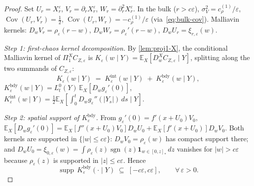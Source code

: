 \documentclass[EJP]{ejpecp}
\renewcommand{\E}{\mathbb{E}}
\newcommand{\IBM}{Z}
\newcommand{\Pir}{\Pi}
\DeclareMathOperator{\Cov}{Cov}
\DeclareMathOperator{\supp}{supp}
\DeclareMathOperator{\sgn}{sgn}
\begin{document}
\begin{proof}
Set $U_r=X^\varepsilon_r$, $V_r=\partial_rX^\varepsilon_r$,
$W_r=\partial_r^{2}X^\varepsilon_r$. In the bulk ($r>c\varepsilon$),
$\sigma_V^{2}=c_\rho^{(1)}/\varepsilon$, $\Cov(U_r,V_r)=\tfrac12$,
$\Cov(U_r,W_r)=-c_\rho^{(1)}/\varepsilon$
(via~\eqref{eq:bulk-cov}). Malliavin kernels:
$D_wV_r=\rho_\varepsilon(r-w)$, $D_wW_r=\rho_\varepsilon'(r-w)$,
$D_wU_r=\xi_{r,\varepsilon}(w)$.

\emph{Step 1: first-chaos kernel decomposition.}
By \cref{lem:proj1-X}, the conditional Malliavin kernel of
$\Pir_1^{X}C_{\IBM,\varepsilon}$ is
$K_\varepsilon(w\mid Y)=\E_X[D_w^{X}C_{\IBM,\varepsilon}\mid Y]$,
splitting along the two summands of $C_{\IBM,\varepsilon}$:
\begin{equation}\label{eq:Kdecomp}
  K_\varepsilon(w\mid Y)
   \;=\;K_\varepsilon^{\mathrm{int}}(w\mid Y)
   \;+\;K_\varepsilon^{\mathrm{bdy}}(w\mid Y),
\end{equation}
$K_\varepsilon^{\mathrm{bdy}}(w\mid Y)=L_t^{0}(Y)\,\E_X[D_wg_\varepsilon'(0)]$,
$K_\varepsilon^{\mathrm{int}}(w\mid Y)=\tfrac12\E_X[\int_0^t D_w g_\varepsilon''(|Y_s|)\,ds\mid Y]$.

\emph{Step 2: spatial support of $K_\varepsilon^{\mathrm{bdy}}$.}
From $g_\varepsilon'(0)=f'(x+U_0)V_0$,
$\E_X[D_wg_\varepsilon'(0)]=\E_X[f''(x+U_0)V_0]D_wU_0
+\E_X[f'(x+U_0)]D_wV_0$.
Both kernels are supported in $\{|w|\le c\varepsilon\}$:
$D_wV_0=\rho_\varepsilon(w)$ has compact support there; and
$D_wU_0=\xi_{0,\varepsilon}(w)=\int\rho_\varepsilon(z)\sgn(z)\mathbf 1_{w\in[0,z]_*}\,dz$
vanishes for $|w|>c\varepsilon$ because $\rho_\varepsilon(z)$ is
supported in $|z|\le c\varepsilon$. Hence
\begin{equation}\label{eq:Kbdy-support}
  \supp\,K_\varepsilon^{\mathrm{bdy}}(\cdot\mid Y)
   \;\subseteq\;[-c\varepsilon,c\varepsilon],\qquad\forall\,\varepsilon>0.
\end{equation}


\end{proof}
\end{document}
